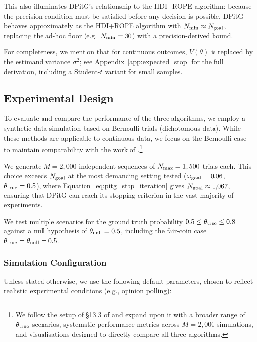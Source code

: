This also illuminates DPitG's relationship to the HDI+ROPE algorithm: because the
precision condition must be satisfied before any decision is possible, DPitG behaves
approximately as the HDI+ROPE algorithm with $N_{\rm min} \approx N_{\rm goal}$, replacing
the ad-hoc floor (e.g.\ $N_{\rm min}=30$) with a precision-derived bound.

For completeness, we mention that for continuous outcomes, $V(\theta)$ is replaced by the
estimand variance $\sigma^2$; see Appendix~\ref{app:expected_stop} for the full
derivation, including a Student-$t$ variant for small samples.

\subsection{Experimental Design}\label{sec:experimental_design}

To evaluate and compare the performance of the three algorithms,
we employ a synthetic data simulation based on Bernoulli trials (dichotomous data).
While these methods are applicable to continuous data, we focus on the Bernoulli case
to maintain comparability with the work of \cite{kruschke2015doing}.\footnote{We follow
the setup of \S13.3 of \cite{kruschke2015doing} and expand upon it with a broader
range of $\theta_{\rm true}$ scenarios, systematic performance metrics across $M=2{,}000$
simulations, and visualisations designed to directly compare all three algorithms.}

We generate $M=2,000$ independent sequences of $N_{\rm max}=1,500$ trials each.
This choice exceeds $N_{\rm goal}$ at the most demanding setting tested ($\omega_{\rm goal}=0.06$,
$\theta_{\rm true}=0.5$), where Equation~\ref{eq:pitg_stop_iteration} gives $N_{\rm goal}\approx 1{,}067$,
ensuring that DPitG can reach its stopping criterion in the vast majority of experiments.

We test multiple scenarios for the ground truth probability $0.5 \le \theta_{\rm true} \le 0.8$
against a null hypothesis of $\theta_{\rm null}=0.5$, including the fair-coin case
$\theta_{\rm true}=\theta_{\rm null}=0.5$.
\subsubsection*{Simulation Configuration}

Unless stated otherwise, we use the following default parameters, chosen to reflect realistic experimental conditions (e.g., opinion polling):

